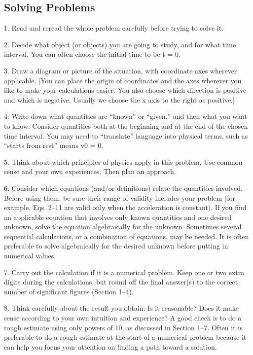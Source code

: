 \documentclass{extarticle}
\begin{document}
\begin{tcolorbox}[enhanced jigsaw,sharp corners,coltext=black,colback=BurntOrange!25!white,boxrule=0pt,breakable,size=minimal]
\subsection{Solving Problems}

1. Read and reread the whole problem carefully before trying to solve it.  

2. Decide what object (or objects) you are going to study, and for what time interval. You can often choose the initial time to be t = 0.  

3. Draw a diagram or picture of the situation, with coordinate axes wherever applicable. [You can place the origin of coordinates and the axes wherever you like to make your calculations easier. You also choose which direction is positive and which is negative. Usually we choose the x axis to the right as positive.]  

4. Write down what quantities are “known” or “given,” and then what you want to know. Consider quantities both at the beginning and at the end of the chosen time interval. You may need to “translate” language into physical terms, such as “starts from rest” means v0 = 0.  

5. Think about which principles of physics apply in this problem. Use common sense and your own experiences. Then plan an approach.  

6. Consider which equations (and/or definitions) relate the quantities involved. Before using them, be sure their range of validity includes your problem (for example, Eqs. 2–11 are valid only when the acceleration is constant). If you find an applicable  equation that involves only known quantities and one desired unknown, solve the equation algebraically for the unknown. Sometimes several sequential calculations, or a combination of equations, may be needed. It is often preferable to solve algebraically for the desired unknown before putting in numerical values.  

7. Carry out the calculation if it is a numerical problem. Keep one or two extra digits during the calculations, but round off the final answer(s) to the correct number of significant figures (Section 1–4).  

8. Think carefully about the result you obtain: Is it reasonable? Does it make sense according to your own intuition and experience? A good check is to do a rough estimate using only powers of 10, as discussed in Section 1–7. Often it is preferable to do a rough estimate at the start of a numerical problem because it can help you focus your attention on finding a path toward a solution.  


\end{tcolorbox}
\end{document}
